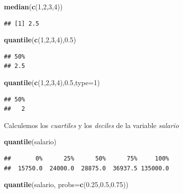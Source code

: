 \documentclass[]{book}
\newenvironment{Shaded}{\begin{snugshade}}{\end{snugshade}}
\newcommand{\DataTypeTok}[1]{\textcolor[rgb]{0.13,0.29,0.53}{#1}}
\newcommand{\DecValTok}[1]{\textcolor[rgb]{0.00,0.00,0.81}{#1}}
\newcommand{\FloatTok}[1]{\textcolor[rgb]{0.00,0.00,0.81}{#1}}
\newcommand{\KeywordTok}[1]{\textcolor[rgb]{0.13,0.29,0.53}{\textbf{#1}}}
\newcommand{\NormalTok}[1]{#1}
\begin{document}
\begin{Shaded}
\begin{Highlighting}[]
\KeywordTok{median}\NormalTok{(}\KeywordTok{c}\NormalTok{(}\DecValTok{1}\NormalTok{,}\DecValTok{2}\NormalTok{,}\DecValTok{3}\NormalTok{,}\DecValTok{4}\NormalTok{))}
\end{Highlighting}
\end{Shaded}

\begin{verbatim}
## [1] 2.5
\end{verbatim}

\begin{Shaded}
\begin{Highlighting}[]
\KeywordTok{quantile}\NormalTok{(}\KeywordTok{c}\NormalTok{(}\DecValTok{1}\NormalTok{,}\DecValTok{2}\NormalTok{,}\DecValTok{3}\NormalTok{,}\DecValTok{4}\NormalTok{),}\FloatTok{0.5}\NormalTok{)}
\end{Highlighting}
\end{Shaded}

\begin{verbatim}
## 50% 
## 2.5
\end{verbatim}

\begin{Shaded}
\begin{Highlighting}[]
\KeywordTok{quantile}\NormalTok{(}\KeywordTok{c}\NormalTok{(}\DecValTok{1}\NormalTok{,}\DecValTok{2}\NormalTok{,}\DecValTok{3}\NormalTok{,}\DecValTok{4}\NormalTok{),}\FloatTok{0.5}\NormalTok{,}\DataTypeTok{type=}\DecValTok{1}\NormalTok{)}
\end{Highlighting}
\end{Shaded}

\begin{verbatim}
## 50% 
##   2
\end{verbatim}

Calculemos los \emph{cuartiles} y los \emph{deciles} de la variable \emph{salario}

\begin{Shaded}
\begin{Highlighting}[]
\KeywordTok{quantile}\NormalTok{(salario)}
\end{Highlighting}
\end{Shaded}

\begin{verbatim}
##       0%      25%      50%      75%     100% 
##  15750.0  24000.0  28875.0  36937.5 135000.0
\end{verbatim}

\begin{Shaded}
\begin{Highlighting}[]
\KeywordTok{quantile}\NormalTok{(salario, }\DataTypeTok{probs=}\KeywordTok{c}\NormalTok{(}\FloatTok{0.25}\NormalTok{,}\FloatTok{0.5}\NormalTok{,}\FloatTok{0.75}\NormalTok{))}
\end{Highlighting}
\end{Shaded}
\end{document}
